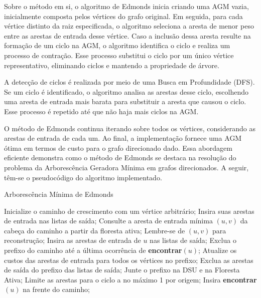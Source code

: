 \documentclass[12pt]{article}
\begin{document}
Sobre o método em si, o algoritmo de Edmonds inicia criando uma AGM vazia, inicialmente composta pelos vértices do grafo original. Em seguida, para cada vértice distinto da raiz especificada, o algoritmo seleciona a aresta de menor peso entre as arestas de entrada desse vértice. Caso a inclusão dessa aresta resulte na formação de um ciclo na AGM, o algoritmo identifica o ciclo e realiza um processo de contração. Esse processo substitui o ciclo por um único vértice representativo, eliminando ciclos e mantendo a propriedade de árvore.

A detecção de ciclos é realizada por meio de uma Busca em Profundidade (DFS). Se um ciclo é identificado, o algoritmo analisa as arestas desse ciclo, escolhendo uma aresta de entrada mais barata para substituir a aresta que causou o ciclo. Esse processo é repetido até que não haja mais ciclos na AGM.

O método de Edmonds continua iterando sobre todos os vértices, considerando as arestas de entrada de cada um. Ao final, a implementação fornece uma AGM ótima em termos de custo para o grafo direcionado dado. Essa abordagem eficiente demonstra como o método de Edmonds se destaca na resolução do problema da Arborescência Geradora Mínima em grafos direcionados. A seguir, têm-se o pseudocódigo do algoritmo implementado.

\begin{algorithm}
\caption{Arborescência Mínima de Edmonds}
\begin{algorithmic}[1]
\State Inicialize o caminho de crescimento com um vértice arbitrário;
\State Insira suas arestas de entrada nas listas de saída;
    \State Consulte a aresta de entrada mínima $(u, v)$ da cabeça do caminho a partir da floresta ativa;
    \State Lembre-se de $(u, v)$ para reconstrução;
        \State Insira as arestas de entrada de $u$ nas listas de saída;
    \Else
        \State Exclua o prefixo do caminho até a última ocorrência de \textbf{encontrar}$(u)$;
        \State Atualize os custos das arestas de entrada para todos os vértices no prefixo;
        \State Exclua as arestas de saída do prefixo das listas de saída;
        \State Junte o prefixo na DSU e na Floresta Ativa;
        \State Limite as arestas para o ciclo a no máximo 1 por origem;
    \EndIf
    \State Insira \textbf{encontrar}$(u)$ na frente do caminho;
\EndWhile
\end{algorithmic}
\end{algorithm}
\end{document}
